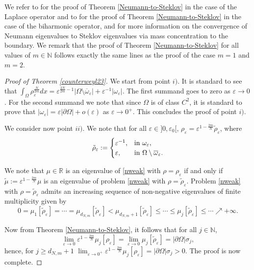 \documentclass[11pt,a4paper]{amsart}
\numberwithin{equation}{section}
\begin{document}
We refer to \cite{lambertiprovenzano1,lambertiprovenzanoedinburgh} for the proof of Theorem \ref{Neumann-to-Steklov} in the case of the Laplace operator and to \cite{buosoprovenzano} for the proof of Theorem \ref{Neumann-to-Steklov} in the case of the biharmonic operator, and for more information on the convergence of Neumann eigenvalues to Steklov eigenvalues via mass concentration to the boundary. We remark that the proof of Theorem \ref{Neumann-to-Steklov} for all values of $m\in\mathbb N$ follows exactly the same lines as the proof of the case $m=1$ and $m=2$. 


\begin{proof}[Proof of Theorem \ref{counterweyl23}]
We start from point $i)$. It is standard to see that $\int_{\Omega}\rho_{\varepsilon}^{\frac{N}{2m}} dx=\varepsilon^{\frac{2N}{2m}-1}|\Omega\setminus\overline\omega_{\varepsilon}|+\varepsilon^{-1}|\omega_{\varepsilon}|$. The first summand goes to zero as $\varepsilon\rightarrow 0$. For the second summand we note that since $\Omega$ is of class $C^2$, it is standard to prove that $|\omega_{\varepsilon}|=\varepsilon|\partial\Omega|+o(\varepsilon)$ as $\varepsilon\rightarrow 0^+$. This concludes the proof of point $i)$.

We consider now point $ii)$. We note that for all $\varepsilon\in]0,\varepsilon_0[$, $\rho_{\varepsilon}=\varepsilon^{1-\frac{2m}{N}}\tilde\rho_{\varepsilon}$, where
\begin{equation*}%
\tilde\rho_{\varepsilon}:=
\begin{cases}
\varepsilon^{-1},& {\rm in\ } \omega_{\varepsilon},\\
\varepsilon,& {\rm in\ } \Omega\setminus\overline\omega_{\varepsilon}.
\end{cases}
\end{equation*}

We note that $\mu\in\mathbb R$ is an eigenvalue of \eqref{nweak} with $\rho=\rho_{\varepsilon}$ if and only if $\tilde\mu:=\varepsilon^{1-\frac{2m}{N}}\mu$ is an eigenvalue of problem \eqref{nweak} with $\rho=\tilde\rho_{\varepsilon}$. Problem \eqref{nweak} with $\rho=\tilde\rho_{\varepsilon}$ admits an increasing sequence of non-negative eigenvalues of finite multiplicity given by
$$
0=\mu_1[\tilde\rho_{\varepsilon}]=\cdots=\mu_{d_{N,m}}[\tilde\rho_{\varepsilon}]<\mu_{d_{N,m}+1}[\tilde\rho_{\varepsilon}]\leq\cdots\leq\mu_j[\tilde\rho_{\varepsilon}]\leq\cdots\nearrow +\infty.
$$

Now from Theorem \ref{Neumann-to-Steklov}, it follows that for all $j\in\mathbb N$,
$$
\lim_{\varepsilon\rightarrow 0}\varepsilon^{1-\frac{2m}{N}}\mu_j[\rho_{\varepsilon}]=\lim_{\varepsilon\rightarrow 0}\mu_j[\tilde\rho_{\varepsilon}]=|\partial\Omega|\sigma_j,
$$
hence, for $j\geq d_{N,m}+1$ $\lim_{\varepsilon\rightarrow 0^+}\varepsilon^{1-\frac{2m}{N}}\mu_j[\rho_{\varepsilon}]=|\partial\Omega|\sigma_j>0$. The proof is now complete.


\end{proof}
\end{document}
